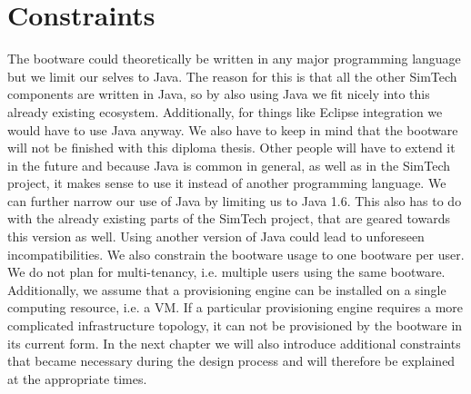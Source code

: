 \section{Constraints}

The bootware could theoretically be written in any major programming language but we limit our selves to Java.
The reason for this is that all the other SimTech components are written in Java, so by also using Java we fit nicely into this already existing ecosystem.
Additionally, for things like Eclipse integration we would have to use Java anyway.
We also have to keep in mind that the bootware will not be finished with this diploma thesis.
Other people will have to extend it in the future and because Java is common in general, as well as in the SimTech project, it makes sense to use it instead of another programming language.
We can further narrow our use of Java by limiting us to Java 1.6.
This also has to do with the already existing parts of the SimTech project, that are geared towards this version as well.
Using another version of Java could lead to unforeseen incompatibilities.
We also constrain the bootware usage to one bootware per user.
We do not plan for multi-tenancy, i.e. multiple users using the same bootware.
Additionally, we assume that a provisioning engine can be installed on a single computing resource, i.e. a VM.
If a particular provisioning engine requires a more complicated infrastructure topology, it can not be provisioned by the bootware in its current form.
In the next chapter we will also introduce additional constraints that became necessary during the design process and will therefore be explained at the appropriate times.
